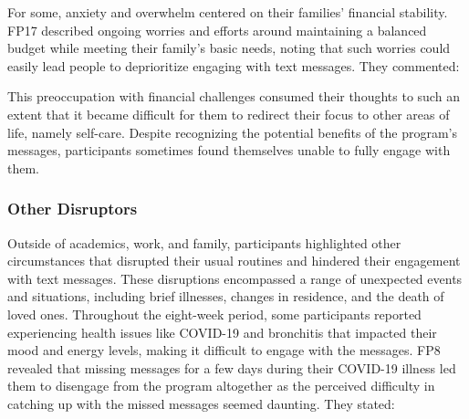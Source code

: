 For some, anxiety and overwhelm centered on their families' financial stability. FP17 described ongoing worries and efforts around maintaining a balanced budget while meeting their family's basic needs, noting that such worries could easily lead people to deprioritize engaging with text messages. They commented:


\noindent
This preoccupation with financial challenges consumed their thoughts to such an extent that it became difficult for them to redirect their focus to other areas of life, namely self-care. Despite recognizing the potential benefits of the program's messages, participants sometimes found themselves unable to fully engage with them.




\subsubsection{Other Disruptors}

Outside of academics, work, and family, participants highlighted other circumstances that disrupted their usual routines and hindered their engagement with text messages. These disruptions encompassed a range of unexpected events and situations, including brief illnesses, changes in residence, and the death of loved ones. Throughout the eight-week period, some participants reported experiencing health issues like COVID-19 and bronchitis that impacted their mood and energy levels, making it difficult to engage with the messages.
FP8 revealed that missing messages for a few days during their COVID-19 illness led them to disengage from the program altogether as the perceived difficulty in catching up with the missed messages seemed daunting. They stated:

